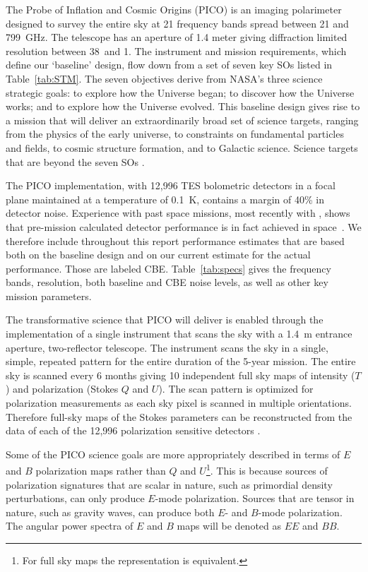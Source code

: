 \documentclass[PICOReport.tex]{subfiles}
\begin{document}
 
The Probe of Inflation and Cosmic Origins (PICO) is an imaging polarimeter designed to survey the entire sky at 21 frequency bands spread between 21 and 799~GHz.  The telescope has an aperture of 1.4 meter giving diffraction limited resolution between 38\arcmin\ and 1\arcmin . The instrument and mission requirements, which define our `baseline' design, flow down from a set of seven key \ac{SOs} listed in Table~\ref{tab:STM}. The seven objectives derive from NASA's three science strategic goals: to explore how the Universe began; to discover how the Universe works; and to explore how the Universe evolved.  This baseline design gives rise to a mission that will deliver an extraordinarily broad set of science targets, ranging from the physics of the early universe, to constraints on fundamental particles and fields, to cosmic structure formation, and to Galactic science. Science targets that are beyond the seven \ac{SOs} . 

The PICO implementation, with 12,996 \ac{TES} bolometric detectors in a focal plane maintained at a temperature of 0.1~K, contains a margin of 40\% in detector noise. Experience with past space missions, most recently with \planck , shows that pre-mission calculated detector performance is in fact achieved in space~\cite{planck1101.2038,planck1101.2039}. We therefore include throughout this report performance estimates that are based both on the baseline design and on our current estimate for the actual performance. Those are labeled \ac{CBE}. Table~\ref{tab:specs} gives the frequency bands, resolution, both baseline and \ac{CBE} noise levels, as well as other key mission parameters. 

The transformative science that PICO will deliver is enabled through the implementation of a single instrument that scans the sky with a 1.4~m entrance aperture, two-reflector telescope. The instrument scans the sky in a single, simple, repeated pattern for the entire duration of the 5-year mission. The entire sky is scanned every 6 months giving 10 independent full sky maps of intensity ($T$) and polarization (Stokes $Q$ and $U$). The scan pattern is optimized for polarization measurements as each sky pixel is scanned in multiple orientations. Therefore full-sky maps of the Stokes parameters can be reconstructed from the data of each of the 12,996 polarization sensitive detectors . 

Some of the PICO science goals are more appropriately described in terms of $E$ and $B$ polarization maps rather than $Q$ and $U$\footnote{For full sky maps the representation is equivalent.}. This is because sources of polarization signatures that are scalar in nature, such as primordial density perturbations, can only produce $E$-mode polarization. Sources that are tensor in nature, such as gravity waves, can produce both $E$- and $B$-mode polarization. The angular power spectra of $E$ and $B$ maps will be denoted as $EE$ and $BB$.  
\end{document}
